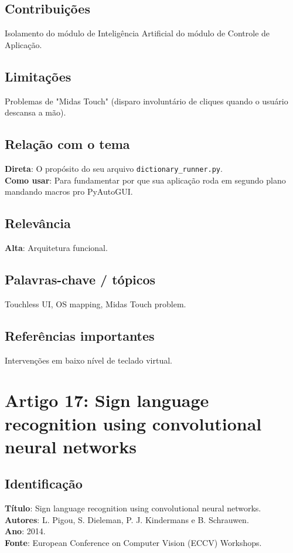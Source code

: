 \documentclass[12pt, a4paper]{article}
\begin{document}
\subsection{Contribuições}
Isolamento do módulo de Inteligência Artificial do módulo de Controle de Aplicação.\\
\subsection{Limitações}
Problemas de "Midas Touch" (disparo involuntário de cliques quando o usuário descansa a mão).\\
\subsection{Relação com o tema}
\textbf{Direta}: O propósito do seu arquivo \texttt{dictionary\_runner.py}.\\
\textbf{Como usar}: Para fundamentar por que sua aplicação roda em segundo plano mandando macros pro PyAutoGUI.\\
\subsection{Relevância}
\textbf{Alta}: Arquitetura funcional.\\
\subsection{Palavras-chave / tópicos}
Touchless UI, OS mapping, Midas Touch problem.\\
\subsection{Referências importantes}
Intervenções em baixo nível de teclado virtual.
\newpage

\section{Artigo 17: Sign language recognition using convolutional neural networks}
\subsection{Identificação}
\textbf{Título}: Sign language recognition using convolutional neural networks.\\
\textbf{Autores}: L. Pigou, S. Dieleman, P. J. Kindermans e B. Schrauwen.\\
\textbf{Ano}: 2014.\\
\textbf{Fonte}: European Conference on Computer Vision (ECCV) Workshops.\\
\end{document}
